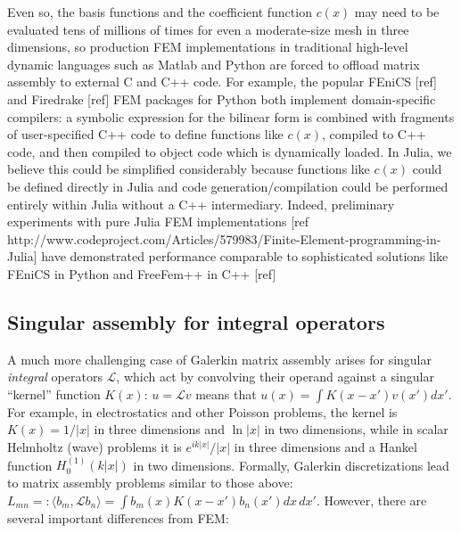 Even so, the basis functions and the coefficient function $c(x)$ may need to be evaluated tens of millions of times for even a moderate-size mesh in three dimensions, so production FEM implementations in traditional high-level dynamic languages such as Matlab and Python are forced to offload matrix assembly to external C and C++ code.  For example, the popular FEniCS [ref] and Firedrake [ref] FEM packages for Python both implement domain-specific compilers: a symbolic expression for the bilinear form is combined with fragments of user-specified C++ code to define functions like $c(x)$, compiled to C++ code, and then compiled to object code which is dynamically loaded. In Julia, we believe this could be simplified considerably because functions like $c(x)$ could be defined directly in Julia and code generation/compilation could be performed entirely within Julia without a C++ intermediary.  Indeed, preliminary experiments with pure Julia FEM implementations [ref http://www.codeproject.com/Articles/579983/Finite-Element-programming-in-Julia] have demonstrated performance comparable to sophisticated solutions like FEniCS in Python and FreeFem++ in C++ [ref]

\subsection{Singular assembly for integral operators}

A much more challenging case of Galerkin matrix assembly arises for
singular \emph{integral} operators $\mathcal{L}$, which act by
convolving their operand against a singular ``kernel'' function
$K(x)$: $u = \mathcal{L} v$ means that $u(x) = \int K(x - x') v(x')
dx'$.  For example, in electrostatics and other Poisson problems, the
kernel is $K(x) = 1/|x|$ in three dimensions and $\ln |x|$ in two
dimensions, while in scalar Helmholtz (wave) problems it is
$e^{ik|x|}/|x|$ in three dimensions and a Hankel function
$H^{(1)}_0(k|x|)$ in two dimensions.  Formally, Galerkin
discretizations lead to matrix assembly problems similar to those
above: $L_{mn} =: \langle b_m, \mathcal{L} b_n \rangle = \int b_m(x)
K(x - x') b_n(x') dx\,dx'$.  However, there are several important
differences from FEM:

